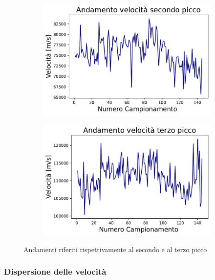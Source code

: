 \begin{figure}[H]
\centering

\begin{subfigure}[h!]{0.49\textwidth}
	\includegraphics[width=\textwidth]{Seconda_SI.pdf}
    \label{fig:sub1}
\end{subfigure}
\hfill
\begin{subfigure}[h!]{0.49\textwidth}
    \includegraphics[width=\textwidth]{Terza_SI.pdf}
    \label{fig:sub2}
\end{subfigure}
\caption{Andamenti riferiti rispettivamente al secondo e al terzo picco}
\end{figure}


\subsubsection{Dispersione delle velocità}

